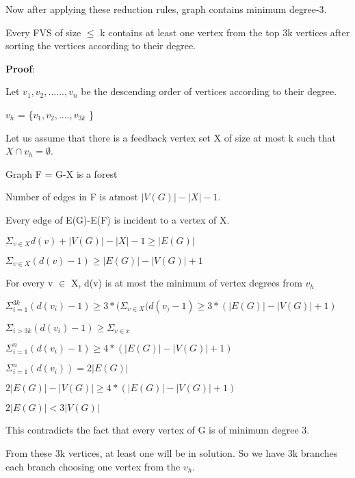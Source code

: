 Now after applying these reduction rules, graph contains minimum degree-3. 

\begin{theorem}
Every FVS of size $\leq$ k contains at least one vertex from the top 3k vertices after sorting
the vertices according to their degree. 
\end{theorem}

\textbf{Proof}:

Let $v_1, v_2, ......, v_n$ be the descending order of vertices according to their degree. 

\hspace*{2cm} $v_h$ = \{$v_1,v_2,....,v_{3k}$ \} 

Let us assume that there is a feedback vertex set X of size at most k 
such that $X \cap v_{h} = \emptyset$.

Graph F = G-X is a forest  

Number of edges in F is atmost $|V(G)|-|X|-1$. 

Every edge of E(G)-E(F) is incident to a vertex of X. 

\hspace*{2cm} $\Sigma_{v \in X} d(v) + |V(G)|-|X|-1 \geq |E(G)|$ 

\hspace*{2cm} $\Sigma_{v \in X} (d(v)-1) \geq |E(G)|-|V(G)|+1$ 

For every v $\in$ X, d(v) is at most the minimum of vertex degrees from $v_h$ 

\hspace*{2cm} $\Sigma_{i=1}^{3k}(d(v_i)-1) \geq 3*(\Sigma_{v \in X}(d(v_)-1) \geq 3*(|E(G)|-|V(G)|+1)$ 

\hspace*{2cm} $\Sigma_{i>3k}(d(v_i)-1) \geq \Sigma_{v \in x}$     

\hspace*{2cm} $\Sigma_{i=1}^{n}(d(v_i)-1) \geq 4*(|E(G)|-|V(G)|+1)$ 

\hspace*{2cm} $\Sigma_{i=1}^{n}(d(v_i)) = 2|E(G)|$ 

\hspace*{2cm} $2|E(G)| - |V(G)| \geq 4*(|E(G)|-|V(G)|+1)$ 

\hspace*{2cm} $2|E(G)| < 3|V(G)|$ 

This contradicts the fact that every vertex of G is of minimum degree 3.

From these 3k vertices, at least one will be in solution. So we have 3k branches each branch
choosing one vertex from the $v_h$. 

